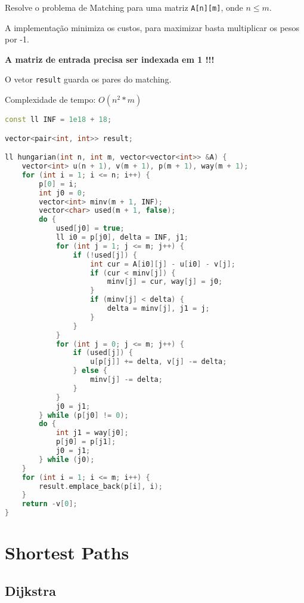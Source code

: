 \documentclass[11pt, a4paper, oneside]{book}
\begin{document}
Resolve o problema de Matching para uma matriz \lstinline{A[n][m]}, onde $n \leq m$.



A implementação minimiza os custos, para maximizar basta multiplicar os pesos por -1.



\textbf{A matriz de entrada precisa ser indexada em 1 !!!}



O vetor \lstinline{result} guarda os pares do matching.



Complexidade de tempo: $O(n^2 * m)$
\hfill

\begin{multicols}{2}
\begin{lstlisting}[language=C++]
const ll INF = 1e18 + 18;

vector<pair<int, int>> result;

ll hungarian(int n, int m, vector<vector<int>> &A) {
    vector<int> u(n + 1), v(m + 1), p(m + 1), way(m + 1);
    for (int i = 1; i <= n; i++) {
        p[0] = i;
        int j0 = 0;
        vector<int> minv(m + 1, INF);
        vector<char> used(m + 1, false);
        do {
            used[j0] = true;
            ll i0 = p[j0], delta = INF, j1;
            for (int j = 1; j <= m; j++) {
                if (!used[j]) {
                    int cur = A[i0][j] - u[i0] - v[j];
                    if (cur < minv[j]) {
                        minv[j] = cur, way[j] = j0;
                    }
                    if (minv[j] < delta) {
                        delta = minv[j], j1 = j;
                    }
                }
            }
            for (int j = 0; j <= m; j++) {
                if (used[j]) {
                    u[p[j]] += delta, v[j] -= delta;
                } else {
                    minv[j] -= delta;
                }
            }
            j0 = j1;
        } while (p[j0] != 0);
        do {
            int j1 = way[j0];
            p[j0] = p[j1];
            j0 = j1;
        } while (j0);
    }
    for (int i = 1; i <= m; i++) {
        result.emplace_back(p[i], i);
    }
    return -v[0];
}
\end{lstlisting}
\end{multicols}

\hfill

\section{Shortest Paths}
\subsection{Dijkstra}
\end{document}
